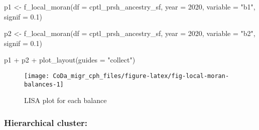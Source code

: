 \documentclass[
  12pt,
]{article}
\newenvironment{Shaded}{\begin{snugshade}}{\end{snugshade}}
\newcommand{\AttributeTok}[1]{\textcolor[rgb]{0.77,0.63,0.00}{#1}}
\newcommand{\DecValTok}[1]{\textcolor[rgb]{0.00,0.00,0.81}{#1}}
\newcommand{\FloatTok}[1]{\textcolor[rgb]{0.00,0.00,0.81}{#1}}
\newcommand{\FunctionTok}[1]{\textcolor[rgb]{0.00,0.00,0.00}{#1}}
\newcommand{\NormalTok}[1]{#1}
\newcommand{\OtherTok}[1]{\textcolor[rgb]{0.56,0.35,0.01}{#1}}
\newcommand{\SpecialCharTok}[1]{\textcolor[rgb]{0.00,0.00,0.00}{#1}}
\newcommand{\StringTok}[1]{\textcolor[rgb]{0.31,0.60,0.02}{#1}}
\begin{document}
\begin{Shaded}
\begin{Highlighting}[]
\NormalTok{p1 }\OtherTok{\textless{}{-}} \FunctionTok{f\_local\_moran}\NormalTok{(}\AttributeTok{df =}\NormalTok{ cptl\_prsh\_ancestry\_sf,}
              \AttributeTok{year =} \DecValTok{2020}\NormalTok{, }
              \AttributeTok{variable =} \StringTok{"b1"}\NormalTok{, }
              \AttributeTok{signif =} \FloatTok{0.1}\NormalTok{)}

\NormalTok{p2 }\OtherTok{\textless{}{-}} \FunctionTok{f\_local\_moran}\NormalTok{(}\AttributeTok{df =}\NormalTok{ cptl\_prsh\_ancestry\_sf,}
              \AttributeTok{year =} \DecValTok{2020}\NormalTok{, }
              \AttributeTok{variable =} \StringTok{"b2"}\NormalTok{, }
              \AttributeTok{signif =} \FloatTok{0.1}\NormalTok{)}

\NormalTok{p1 }\SpecialCharTok{+}\NormalTok{ p2 }\SpecialCharTok{+} \FunctionTok{plot\_layout}\NormalTok{(}\AttributeTok{guides =} \StringTok{"collect"}\NormalTok{)}
\end{Highlighting}
\end{Shaded}

\begin{figure}[H]

{\centering \texttt{[image: CoDa\_migr\_cph\_files/figure-latex/fig-local-moran-balances-1]} 

}

\caption{LISA plot for each balance}\label{fig:fig-local-moran-balances}
\end{figure}

\hypertarget{hierarchical-cluster}{%
\subsubsection{Hierarchical cluster:}\label{hierarchical-cluster}}
\end{document}
